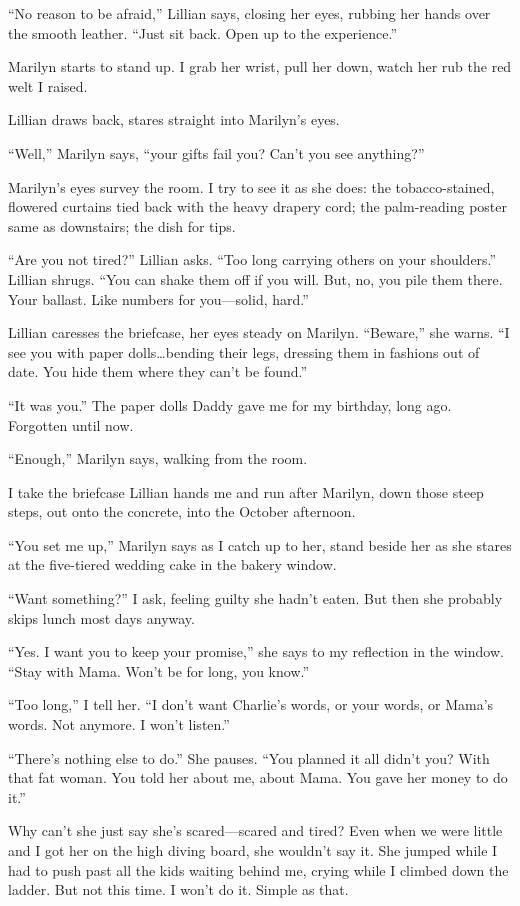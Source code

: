 \documentclass[twoside,10pt]{book}
\begin{document}
``No reason to be afraid,'' Lillian says, closing her eyes, rubbing her
hands over the smooth leather. ``Just sit back. Open up to the
experience.''

Marilyn starts to stand up. I grab her wrist, pull her down, watch her
rub the red welt I raised.

Lillian draws back, stares straight into Marilyn's eyes.

``Well,'' Marilyn says, ``your gifts fail you? Can't you see anything?''

Marilyn's eyes survey the room. I try to see it as she does: the
tobacco-stained, flowered curtains tied back with the heavy drapery
cord; the palm-reading poster same as downstairs; the dish for tips.

``Are you not tired?'' Lillian asks. ``Too long carrying others on your
shoulders.'' Lillian shrugs. ``You can shake them off if you will. But,
no, you pile them there. Your ballast. Like numbers for you---solid,
hard.''

Lillian caresses the briefcase, her eyes steady on Marilyn. ``Beware,''
she warns. ``I see you with paper dolls\ldots bending their legs,
dressing them in fashions out of date. You hide them where they can't be
found.''

``It was you.'' The paper dolls Daddy gave me for my birthday, long ago.
Forgotten until now.

``Enough,'' Marilyn says, walking from the room.

I take the briefcase Lillian hands me and run after Marilyn, down those
steep steps, out onto the concrete, into the October afternoon.

``You set me up,'' Marilyn says as I catch up to her, stand beside her
as she stares at the five-tiered wedding cake in the bakery window.

``Want something?'' I ask, feeling guilty she hadn't eaten. But then she
probably skips lunch most days anyway.

``Yes. I want you to keep your promise,'' she says to my reflection in
the window. ``Stay with Mama. Won't be for long, you know.''

``Too long,'' I tell her. ``I don't want Charlie's words, or your words,
or Mama's words. Not anymore. I won't listen.''

``There's nothing else to do.'' She pauses. ``You planned it all didn't
you? With that fat woman. You told her about me, about Mama. You gave
her money to do it.''

Why can't she just say she's scared---scared and tired? Even when we
were little and I got her on the high diving board, she wouldn't say it.
She jumped while I had to push past all the kids waiting behind me,
crying while I climbed down the ladder. But not this time. I won't do
it. Simple as that.
\end{document}
